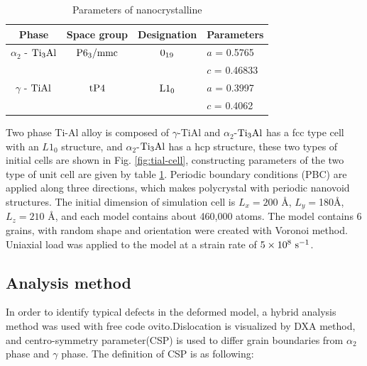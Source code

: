 \documentclass[materials,article,submit,moreauthors,pdftex,10pt,a4paper]{Definitions/mdpi}
\begin{document}
\begin{table}[ht]
	\caption{Parameters of nanocrystalline}
	\centering
	\begin{tabular}{c c c l}
	\toprule
	\textbf{Phase}			& {Space group}		& {Designation} 		& {Parameters} \\
	\midrule
	$\alpha_2$ - $\rm{Ti_3Al}$		& $\rm P6_3/mmc$ 	& $\rm 0_{19}$ 		& $a$ = 0.5765 \\
		&					&					& $c$ = 0.46833 \\
	$\gamma$ - $\rm{TiAl}$ 		& $\rm tP4$ 		& $\rm L1_0$		& $a$ = 0.3997 \\
		&					&					& $c$ = 0.4062 \\			
	\bottomrule
	\end{tabular} 
	\label{tab:lattice_parameter}
\end{table} 

Two phase Ti-Al alloy is composed of $\gamma $-TiAl and $\alpha_2$-$\rm Ti_3Al$ has a fcc type cell with an $L1_0$ structure, and $\alpha_2$-$\rm Ti_3Al$ has a hcp structure, these two types of initial cells are shown in Fig. \ref{fig:tial-cell}, constructing parameters of the two type of unit cell are given by table \ref{tab:lattice_parameter}. Periodic boundary conditions (PBC) are applied along three directions, which makes polycrystal with periodic nanovoid structures. The initial dimension of simulation cell is $L_x =200$ \si{\angstrom}, $L_y = $180\si{\angstrom}, $L_z = 210$ \si{\angstrom}, and each model contains about 460,000 atoms. The model contains 6 grains, with random shape and orientation were created with Voronoi method. Uniaxial load was applied to the model at a strain rate of $5\times10^8\ \rm{s}^{-1}$. 
\subsection{Analysis method}
In order to identify typical defects in the deformed model, a hybrid analysis method was used with free code ovito\cite{Stukowski2010a}.Dislocation is visualized by DXA method, and centro-symmetry parameter(CSP) is used to differ grain boundaries from  $\alpha_2$ phase and $\gamma$ phase. The definition of CSP is as following:
\end{document}
